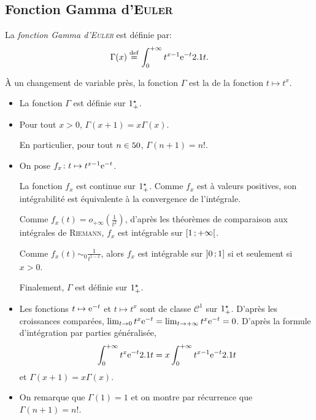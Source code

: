 \subsection{Fonction Gamma d'\textsc{Euler}}\label{subsec:FonctionGammaEuler}

%    

\begin{defi}
    La \emph{fonction Gamma d'\textsc{Euler}} est définie par: 
    $$\Gamma(x) \defeq \int_{0}^{+\infty} t^{x-1} \e^{-t} \d t.$$
\end{defi}

\begin{remarque}
    À un changement de variable près, la fonction $\Gamma$ est la  de la fonction $t \mapsto t^x$. 
\end{remarque} 

\begin{theo}
\begin{itemize}
\item La fonction $\Gamma$ est définie sur $\Rpe$.

\item Pour tout $x > 0$, $\Gamma(x+1) = x\Gamma(x)$.

En particulier, pour tout $n \in \N$, $\Gamma(n+1) = n!$. 
\end{itemize}
\end{theo}

\begin{demo}
\begin{itemize}
\item On pose $\fonctionligne[f_x]{t}{t^{x - 1} \e^{-t}}$.

La fonction $f_x$ est continue sur $\R_+^\star$. Comme $f_x$ est à valeurs positives, son intégrabilité est équivalente à la convergence de l'intégrale.

Comme $f_x(t) = o_{+\infty}\mathopen{}\left(\frac{1}{t^2}\right)$, d'après les théorèmes de comparaison aux intégrales de \textsc{Riemann}, $f_x$ est intégrable sur $\interfo{1}{+\infty}$.

Comme $f_x(t) \sim_0 \frac{1}{t^{1-x}}$, alors $f_x$ est intégrable sur $\interof{0}{1}$ si et seulement si $x > 0$.

Finalement, $\Gamma$ est définie sur $\R_+^\star$.

\item Les fonctions $t \mapsto \e^{-t}$ et $t \mapsto t^x$ sont de classe $\mathscr{C}^1$ sur $\R_+^\star$. D'après les croissances comparées, $\lim_{t\to0} t^x \e^{-t} = \lim_{t\to+\infty} t^x \e^{-t} = 0$. D'après la formule d'intégration par parties généralisée,
\[
\int_0^{+\infty} t^x \e^{-t} \d t = x \int_0^{+\infty} t^{x-1} \e^{-t} \d t
\]
et $\Gamma(x+1) = x \Gamma(x)$.

\item On remarque que $\Gamma(1) = 1$ et on montre par récurrence que $\Gamma(n+1) = n!$.
\end{itemize}
\end{demo}

